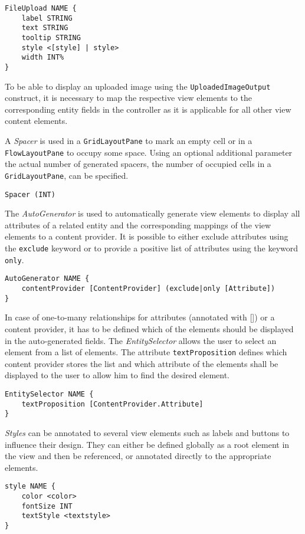 \begin{lstlisting}
FileUpload NAME {
	label STRING
	text STRING
	tooltip STRING		
	style <[style] | style>
	width INT%
}	
\end{lstlisting}

To be able to display an uploaded image using the \lstinline!UploadedImageOutput! construct, it is necessary to map the respective view elements to the corresponding entity fields in the controller as it is applicable for all other view content elements. 

A \textit{Spacer} is used in a \lstinline!GridLayoutPane! to mark an empty cell or in a \lstinline!FlowLayoutPane! to occupy some space.
Using an optional additional parameter the actual number of generated spacers, \ie the number of occupied cells in  a \lstinline!GridLayoutPane!, can be specified.
\begin{lstlisting}
Spacer (INT)
\end{lstlisting}

The \textit{AutoGenerator} is used to automatically generate view elements to display all attributes of a related entity and the corresponding mappings of the view elements to a content provider. It is possible to either exclude attributes using the \lstinline!exclude! keyword or to provide a positive list of attributes using the keyword \lstinline!only!.
\begin{lstlisting}
AutoGenerator NAME {
	contentProvider [ContentProvider] (exclude|only [Attribute])
}
\end{lstlisting}

In case of one-to-many relationships for attributes (annotated with []) or a content provider, it has to be defined which of the elements should be displayed in the auto-generated fields. The \textit{EntitySelector} allows the user to select an element from a list of elements. The attribute \lstinline!textProposition! defines which content provider stores the list and which attribute of the elements shall be displayed to the user to allow him to find the desired element.
\begin{lstlisting}
EntitySelector NAME {
	textProposition [ContentProvider.Attribute]
}
\end{lstlisting}

\textit{Styles} can be annotated to several view elements such as labels and buttons to influence their design. They can either be defined globally as a root element in the view and then be referenced, or annotated directly to the appropriate elements.
\begin{lstlisting}
style NAME {
	color <color>
	fontSize INT
	textStyle <textstyle>
}
\end{lstlisting}

